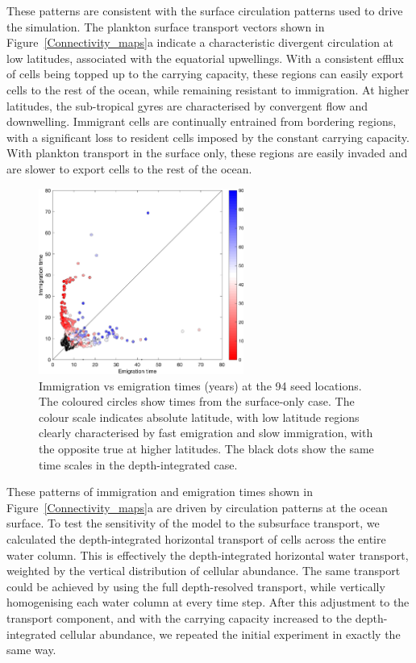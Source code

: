 \documentclass[12pt]{article}
\begin{document}
These patterns are consistent with the surface circulation patterns used to drive the simulation. The plankton surface transport vectors shown in Figure~\ref{Connectivity_maps}a indicate a characteristic divergent circulation at low latitudes, associated with the equatorial upwellings. With a consistent efflux of cells being topped up to the carrying capacity, these regions can easily export cells to the rest of the ocean, while remaining resistant to immigration. At higher latitudes, the sub-tropical gyres are characterised by convergent flow and downwelling. Immigrant cells are continually entrained from bordering regions, with a significant loss to resident cells imposed by the constant carrying capacity. With plankton transport in the surface only, these regions are easily invaded and are slower to export cells to the rest of the ocean.


\begin{figure}[t!]
    \centering
        \includegraphics[width=0.6\textwidth]{../Figures/imm_vs_em.png}
    \caption{Immigration vs emigration times (years) at the 94 seed locations. The coloured circles show times from the surface-only case. The colour scale indicates absolute latitude, with low latitude regions clearly characterised by fast emigration and slow immigration, with the opposite true at higher latitudes. The black dots show the same time scales in the depth-integrated case.}
\label{Imm_vs_em}
\end{figure}

These patterns of immigration and emigration times shown in Figure~\ref{Connectivity_maps}a are driven by circulation patterns at the ocean surface. To test the sensitivity of the model to the subsurface transport, we calculated the depth-integrated horizontal transport of cells across the entire water column. This is effectively the depth-integrated horizontal water transport, weighted by the vertical distribution of cellular abundance. The same transport could be achieved by using the full depth-resolved transport, while vertically homogenising each water column at every time step. After this adjustment to the transport component, and with the carrying capacity increased to the depth-integrated cellular abundance, we repeated the initial experiment in exactly the same way. 
\end{document}
